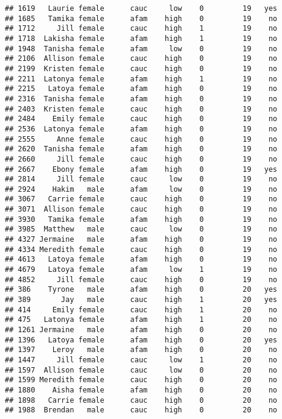 \documentclass[
]{article}
\begin{document}
\begin{verbatim}
## 1619   Laurie female      cauc     low    0         19   yes
## 1685   Tamika female      afam    high    0         19    no
## 1712     Jill female      cauc    high    1         19    no
## 1718  Lakisha female      afam    high    1         19    no
## 1948  Tanisha female      afam     low    0         19    no
## 2106  Allison female      cauc    high    0         19    no
## 2199  Kristen female      cauc    high    0         19    no
## 2211  Latonya female      afam    high    1         19    no
## 2215   Latoya female      afam    high    0         19    no
## 2316  Tanisha female      afam    high    0         19    no
## 2403  Kristen female      cauc    high    0         19    no
## 2484    Emily female      cauc    high    0         19    no
## 2536  Latonya female      afam    high    0         19    no
## 2555     Anne female      cauc    high    0         19    no
## 2620  Tanisha female      afam    high    0         19    no
## 2660     Jill female      cauc    high    0         19    no
## 2667    Ebony female      afam    high    0         19   yes
## 2814     Jill female      cauc     low    0         19    no
## 2924    Hakim   male      afam     low    0         19    no
## 3067   Carrie female      cauc    high    0         19    no
## 3071  Allison female      cauc    high    0         19    no
## 3930   Tamika female      afam    high    0         19    no
## 3985  Matthew   male      cauc     low    0         19    no
## 4327 Jermaine   male      afam    high    0         19    no
## 4334 Meredith female      cauc    high    0         19    no
## 4613   Latoya female      afam    high    0         19    no
## 4679   Latoya female      afam     low    1         19    no
## 4852     Jill female      cauc    high    0         19    no
## 386    Tyrone   male      afam    high    0         20   yes
## 389       Jay   male      cauc    high    1         20   yes
## 414     Emily female      cauc    high    1         20    no
## 475   Latonya female      afam    high    1         20    no
## 1261 Jermaine   male      afam    high    0         20    no
## 1396   Latoya female      afam    high    0         20   yes
## 1397    Leroy   male      afam    high    0         20    no
## 1447     Jill female      cauc     low    1         20    no
## 1597  Allison female      cauc     low    0         20    no
## 1599 Meredith female      cauc    high    0         20    no
## 1880    Aisha female      afam    high    0         20    no
## 1898   Carrie female      cauc    high    0         20    no
## 1988  Brendan   male      cauc    high    0         20    no

\end{verbatim}
\end{document}
